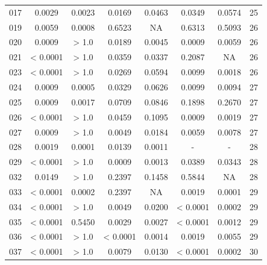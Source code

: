{\begin{longtable}{cccccccc}
017 & {\color{red}0.0029} & {\color{red}0.0023} & {\color{red}0.0169} & {\color{red}0.0463} & {\color{red}0.0349} & 0.0574 & 25 \\
019 & {\color{red}0.0059} & {\color{red}0.0008} & 0.6523 & NA & 0.6313 & 0.5093 & 26 \\
020 & {\color{red}0.0009} & > 1.0 & {\color{red}0.0189} & {\color{red}0.0045} & {\color{red}0.0009} & {\color{red}0.0059} & 26 \\
021 & {\color{red} < 0.0001} & > 1.0 & {\color{red}0.0359} & {\color{red}0.0337} & 0.2087 & NA & 26 \\
023 & {\color{red} < 0.0001} & > 1.0 & 0.0269 & 0.0594 & 0.0099 & 0.0018 & 26 \\
024 & {\color{red}0.0009} & {\color{red}0.0005} & {\color{red}0.0329} & 0.0626 & {\color{red}0.0099} & {\color{red}0.0094} & 27 \\
025 & {\color{red}0.0009} & {\color{red}0.0017} & 0.0709 & 0.0846 & 0.1898 & 0.2670 & 27 \\
026 & {\color{red} < 0.0001} & > 1.0 & {\color{red}0.0459} & 0.1095 & {\color{red}0.0009} & {\color{red}0.0019} & 27 \\
027 & {\color{red}0.0009} & > 1.0 & {\color{red}0.0049} & {\color{red}0.0184} & {\color{red}0.0059} & {\color{red}0.0078} & 27 \\
028 & {\color{red}0.0019} & {\color{red}0.0001} & {\color{red}0.0139} & {\color{red}0.0011} & - & - &  28 \\
029 & {\color{red} < 0.0001} & > 1.0 & {\color{red}0.0009} & {\color{red}0.0013} & {\color{red}0.0389} & {\color{red}0.0343} & 28 \\
032 & {\color{red}0.0149} & > 1.0 & 0.2397 & 0.1458 & 0.5844 & NA & 28 \\
033 & {\color{red} < 0.0001} & {\color{red}0.0002} & 0.2397 & NA & {\color{red}0.0019} & {\color{red}0.0001} & 29 \\
034 & {\color{red} < 0.0001} & > 1.0 & {\color{red}0.0049} & {\color{red}0.0200} & {\color{red} < 0.0001} & {\color{red}0.0002} & 29 \\
035 & {\color{red} < 0.0001} & 0.5450 & {\color{red}0.0029} & {\color{red}0.0027} & {\color{red} < 0.0001} & {\color{red}0.0012} & 29 \\
036 & {\color{red} < 0.0001} & > 1.0 & {\color{red} < 0.0001} & {\color{red}0.0014} & {\color{red}0.0019} & {\color{red}0.0055} & 29 \\
037 & {\color{red} < 0.0001} & > 1.0 & {\color{red}0.0079} & {\color{red}0.0130} & {\color{red} < 0.0001} & {\color{red}0.0002} & 30 \\

\end{longtable}}
